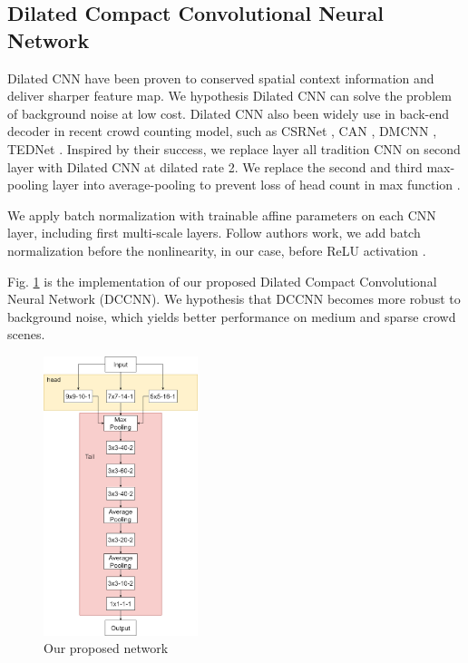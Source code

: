 \subsection{Dilated Compact Convolutional Neural Network}


Dilated CNN have been proven to conserved spatial context information \cite{li2018csrnet} and deliver sharper feature map. We hypothesis Dilated CNN can solve the problem of background noise at low cost. Dilated CNN also been widely use in back-end decoder in recent crowd counting model, such as CSRNet \cite{li2018csrnet}, CAN \cite{liu2019context}, DMCNN \cite{zhang2019crowd}, TEDNet \cite{jiang2019crowd}. Inspired by their success, we replace layer all tradition CNN on second layer with Dilated CNN at dilated rate 2. We replace the second and third max-pooling layer into average-pooling to prevent loss of head count in max function \cite{zhang2019crowd}. 

We apply batch normalization \cite{ioffe2015batch} with trainable affine parameters on each CNN layer, including first multi-scale layers. Follow authors work, we add batch normalization before the nonlinearity, in our case, before ReLU activation \cite{agarap2018deep}. 

Fig. \ref{fig:dccnn} is the implementation of our proposed Dilated Compact Convolutional Neural Network (DCCNN).  We hypothesis that DCCNN becomes more robust to background noise, which yields better performance on medium and sparse crowd scenes. 



\begin{figure}[htbp]
\centerline{\includegraphics[width=0.4\textwidth]{Picture/proposed/tail13_fix2.png}}
\caption{Our proposed network}
\label{fig:dccnn}
\end{figure}




